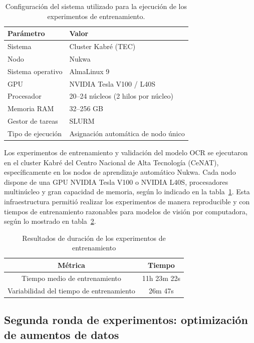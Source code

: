\begin{table}[ht]
	\centering
	\begin{tabular}{ll}
		\toprule
		\textbf{Parámetro} & \textbf{Valor} \\
		\midrule
		Sistema & Cluster Kabré (TEC) \\
		Nodo & Nukwa \\
		Sistema operativo & AlmaLinux 9 \\
		GPU & NVIDIA Tesla V100 / L40S \\
		Procesador & 20–24 núcleos (2 hilos por núcleo) \\
		Memoria RAM & 32–256 GB \\
		Gestor de tareas & SLURM \\
		Tipo de ejecución & Asignación automática de nodo único \\
		\bottomrule
	\end{tabular}
	\caption{Configuración del sistema utilizado para la ejecución de los experimentos de entrenamiento.}
	\label{tab:hardware-cluster}
\end{table}

Los experimentos de entrenamiento y validación del modelo OCR se ejecutaron en el cluster Kabré 
del Centro Nacional de Alta Tecnología (CeNAT), específicamente en los nodos de aprendizaje automático Nukwa.
Cada nodo dispone de una GPU NVIDIA Tesla V100 o NVIDIA L40S,
procesadores multinúcleo y gran capacidad de memoria, según lo indicado en la tabla~\ref{tab:hardware-cluster}.
Esta infraestructura permitió realizar los experimentos de manera reproducible y
con tiempos de entrenamiento razonables para modelos de visión por computadora,
según lo mostrado en tabla~\ref{tab:tiempo-entrenamiento}.

\begin{table}[h]
    \centering
    \begin{tabular}{cc}
        \toprule
        Métrica & Tiempo \\
        \midrule
        Tiempo medio de entrenamiento & 11h 23m 22s \\
        Variabilidad del tiempo de entrenamiento & 26m 47s \\
        \bottomrule
    \end{tabular}
    \caption{Resultados de duración de los experimentos de entrenamiento}
	\label{tab:tiempo-entrenamiento}
\end{table}

\subsection{Segunda ronda de experimentos: optimización de aumentos de datos}

